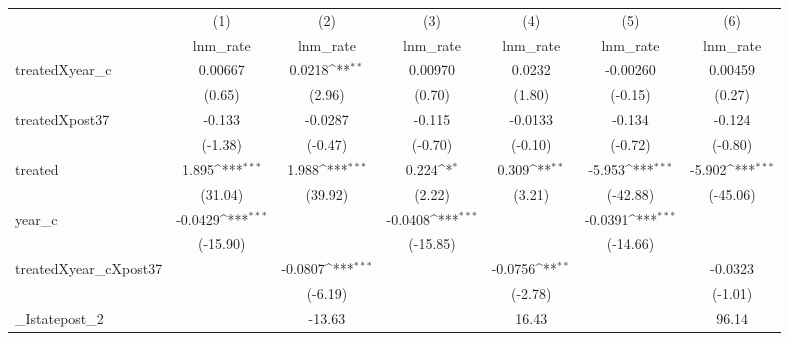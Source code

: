 {
\def\sym#1{\ifmmode^{#1}\else\(^{#1}\)\fi}
\begin{tabular}{l*{6}{c}}
\hline\hline
            &\multicolumn{1}{c}{(1)}&\multicolumn{1}{c}{(2)}&\multicolumn{1}{c}{(3)}&\multicolumn{1}{c}{(4)}&\multicolumn{1}{c}{(5)}&\multicolumn{1}{c}{(6)}\\
            &\multicolumn{1}{c}{lnm\_rate}&\multicolumn{1}{c}{lnm\_rate}&\multicolumn{1}{c}{lnm\_rate}&\multicolumn{1}{c}{lnm\_rate}&\multicolumn{1}{c}{lnm\_rate}&\multicolumn{1}{c}{lnm\_rate}\\
\hline
treatedXyear\_c&     0.00667         &      0.0218\sym{**} &     0.00970         &      0.0232         &    -0.00260         &     0.00459         \\
            &      (0.65)         &      (2.96)         &      (0.70)         &      (1.80)         &     (-0.15)         &      (0.27)         \\
[1em]
treatedXpost37&      -0.133         &     -0.0287         &      -0.115         &     -0.0133         &      -0.134         &      -0.124         \\
            &     (-1.38)         &     (-0.47)         &     (-0.70)         &     (-0.10)         &     (-0.72)         &     (-0.80)         \\
[1em]
treated     &       1.895\sym{***}&       1.988\sym{***}&       0.224\sym{*}  &       0.309\sym{**} &      -5.953\sym{***}&      -5.902\sym{***}\\
            &     (31.04)         &     (39.92)         &      (2.22)         &      (3.21)         &    (-42.88)         &    (-45.06)         \\
[1em]
year\_c      &     -0.0429\sym{***}&                     &     -0.0408\sym{***}&                     &     -0.0391\sym{***}&                     \\
            &    (-15.90)         &                     &    (-15.85)         &                     &    (-14.66)         &                     \\
[1em]
treatedXyear\_cXpost37&                     &     -0.0807\sym{***}&                     &     -0.0756\sym{**} &                     &     -0.0323         \\
            &                     &     (-6.19)         &                     &     (-2.78)         &                     &     (-1.01)         \\
[1em]
\_Istatepost\_2&                     &      -13.63         &                     &       16.43         &                     &       96.14         \\

\end{tabular}}
